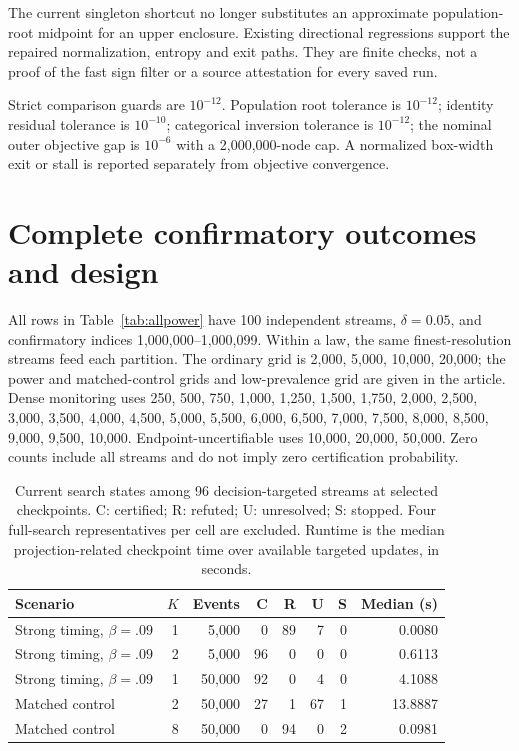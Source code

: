 The current singleton shortcut no longer substitutes an approximate population-root midpoint for an upper enclosure. Existing directional regressions support the repaired normalization, entropy and exit paths. They are finite checks, not a proof of the fast sign filter or a source attestation for every saved run.

Strict comparison guards are $10^{-12}$. Population root tolerance is $10^{-12}$; identity residual tolerance is $10^{-10}$; categorical inversion tolerance is $10^{-12}$; the nominal outer objective gap is $10^{-6}$ with a 2,000,000-node cap. A normalized box-width exit or stall is reported separately from objective convergence.

\section{Complete confirmatory outcomes and design}
All rows in Table~\ref{tab:allpower} have 100 independent streams, $\delta=0.05$, and confirmatory indices 1,000,000--1,000,099. Within a law, the same finest-resolution streams feed each partition. The ordinary grid is 2,000, 5,000, 10,000, 20,000; the power and matched-control grids and low-prevalence grid are given in the article. Dense monitoring uses 250, 500, 750, 1,000, 1,250, 1,500, 1,750, 2,000, 2,500, 3,000, 3,500, 4,000, 4,500, 5,000, 5,500, 6,000, 6,500, 7,000, 7,500, 8,000, 8,500, 9,000, 9,500, 10,000. Endpoint-uncertifiable uses 10,000, 20,000, 50,000. Zero counts include all streams and do not imply zero certification probability.

\Needspace{6.5in}

\begin{table}[!htbp]\centering\small
\caption{Current search states among 96 decision-targeted streams at selected checkpoints. C: certified; R: refuted; U: unresolved; S: stopped. Four full-search representatives per cell are excluded. Runtime is the median projection-related checkpoint time over available targeted updates, in seconds.}\label{tab:searchstates}
\begin{tabular}{lrrrrrrr}\toprule
Scenario & $K$ & Events & C & R & U & S & Median (s)\\\midrule
Strong timing, $\beta=.09$ & 1 & 5,000 & 0 & 89 & 7 & 0 & 0.0080\\
Strong timing, $\beta=.09$ & 2 & 5,000 & 96 & 0 & 0 & 0 & 0.6113\\
Strong timing, $\beta=.09$ & 1 & 50,000 & 92 & 0 & 4 & 0 & 4.1088\\
Matched control & 2 & 50,000 & 27 & 1 & 67 & 1 & 13.8887\\
Matched control & 8 & 50,000 & 0 & 94 & 0 & 2 & 0.0981\\
\bottomrule\end{tabular}
\end{table}

